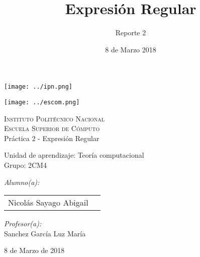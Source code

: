 \documentclass[12pt]{article}
\date{ 8 de Marzo 2018}
\title{Expresión Regular}
\author{Reporte 2}
\begin{document}
		\begin{titlepage}
			\begin{center}
				
				
				\noindent
				\begin{minipage}{0.5\textwidth}
					\begin{flushleft} \large
						\texttt{[image: ../ipn.png]}
					\end{flushleft}
				\end{minipage}%
				\begin{minipage}{0.55\textwidth}
					\begin{flushright} \large
						\texttt{[image: ../escom.png]}
					\end{flushright}
				\end{minipage}
				
				\textsc{\LARGE Instituto Politécnico Nacional}\\[0.5cm]
				
				\textsc{\Large Escuela Superior de Cómputo}\\[1cm]
				
				
				{ \huge Práctica 2 - Expresión Regular \\[1cm] }
				
				{ \Large Unidad de aprendizaje: Teoría computacional} \\[1cm]
				
				{ \Large Grupo: 2CM4 } \\[1cm]
				
				\noindent
				\begin{minipage}{0.5\textwidth}
					\begin{flushleft} \large
						\emph{Alumno(a):}\\
						
						\begin{tabular}{ll}
					     Nicolás Sayago Abigail\\
					\end{tabular}
					\end{flushleft}
				\end{minipage}%
				\begin{minipage}{0.5\textwidth}
					\begin{flushright} \large
						\emph{Profesor(a):} \\
						Sanchez García Luz María  \\
					\end{flushright}
				\end{minipage}
				
				\vfill
				
				{\large 8 de Marzo de 2018}
			\end{center}
		\end{titlepage}
	
\end{document}
